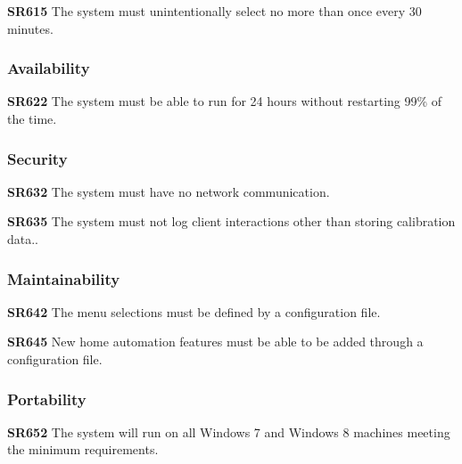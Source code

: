 \documentclass{article}
\begin{document}
\textbf{SR615} The system must unintentionally select no more than once every
30 minutes.

\subsubsection{Availability}

\textbf{SR622} The system must be able to run for 24 hours without restarting
99\% of the time.

\subsubsection{Security}

\textbf{SR632} The system must have no network communication.

\textbf{SR635} The system must not log client interactions other than storing
calibration data..

\subsubsection{Maintainability}

\textbf{SR642} The menu selections must be defined by a configuration file.

\textbf{SR645} New home automation features must be able to be added through a
configuration file.

\subsubsection{Portability}

\textbf{SR652} The system will run on all Windows 7 and Windows 8 machines
meeting the minimum requirements.


\newpage
\end{document}
